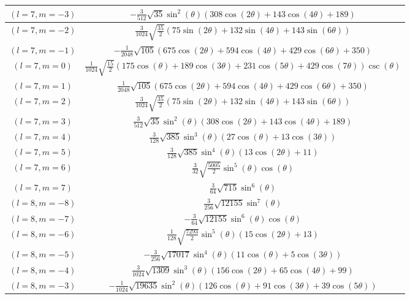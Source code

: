 \begin{center}
\begin{longtable}{|c|c|}
$(l=7, m=-3)$ & $-\frac{3}{512} \sqrt{35} \sin ^2(\theta ) (308 \cos (2 \theta )+143 \cos (4 \theta )+189)$ \\ \hline
$(l=7, m=-2)$ & $\frac{3}{1024} \sqrt{\frac{35}{2}} (75 \sin (2 \theta )+132 \sin (4 \theta )+143 \sin (6 \theta ))$ \\ \hline
\rowcolor{gray!15}
$(l=7, m=-1)$ & $-\frac{1}{2048} \sqrt{105} (675 \cos (2 \theta )+594 \cos (4 \theta )+429 \cos (6 \theta )+350)$ \\ \hline
$(l=7, m=0)$ & $\frac{1}{1024} \sqrt{\frac{15}{2}} (175 \cos (\theta )+189 \cos (3 \theta )+231 \cos (5 \theta )+429 \cos (7 \theta )) \csc (\theta )$ \\ \hline
\rowcolor{gray!15}
$(l=7, m=1)$ & $\frac{1}{2048} \sqrt{105} (675 \cos (2 \theta )+594 \cos (4 \theta )+429 \cos (6 \theta )+350)$ \\ \hline
$(l=7, m=2)$ & $\frac{3}{1024} \sqrt{\frac{35}{2}} (75 \sin (2 \theta )+132 \sin (4 \theta )+143 \sin (6 \theta ))$ \\ \hline
\rowcolor{gray!15}
$(l=7, m=3)$ & $\frac{3}{512} \sqrt{35} \sin ^2(\theta ) (308 \cos (2 \theta )+143 \cos (4 \theta )+189)$ \\ \hline
$(l=7, m=4)$ & $\frac{3}{128} \sqrt{385} \sin ^3(\theta ) (27 \cos (\theta )+13 \cos (3 \theta ))$ \\ \hline
\rowcolor{gray!15}
$(l=7, m=5)$ & $\frac{3}{128} \sqrt{385} \sin ^4(\theta ) (13 \cos (2 \theta )+11)$ \\ \hline
$(l=7, m=6)$ & $\frac{3}{32} \sqrt{\frac{5005}{2}} \sin ^5(\theta ) \cos (\theta )$ \\ \hline
\rowcolor{gray!15}
$(l=7, m=7)$ & $\frac{3}{64} \sqrt{715} \sin ^6(\theta )$ \\ \hline
$(l=8, m=-8)$ & $\frac{3}{256} \sqrt{12155} \sin ^7(\theta )$ \\ \hline
\rowcolor{gray!15}
$(l=8, m=-7)$ & $-\frac{3}{64} \sqrt{12155} \sin ^6(\theta ) \cos (\theta )$ \\ \hline
$(l=8, m=-6)$ & $\frac{1}{128} \sqrt{\frac{7293}{2}} \sin ^5(\theta ) (15 \cos (2 \theta )+13)$ \\ \hline
\rowcolor{gray!15}
$(l=8, m=-5)$ & $-\frac{3}{256} \sqrt{17017} \sin ^4(\theta ) (11 \cos (\theta )+5 \cos (3 \theta ))$ \\ \hline
$(l=8, m=-4)$ & $\frac{3}{1024} \sqrt{1309} \sin ^3(\theta ) (156 \cos (2 \theta )+65 \cos (4 \theta )+99)$ \\ \hline
\rowcolor{gray!15}
$(l=8, m=-3)$ & $-\frac{1}{1024} \sqrt{19635} \sin ^2(\theta ) (126 \cos (\theta )+91 \cos (3 \theta )+39 \cos (5 \theta ))$ \\ \hline

\end{longtable}
\end{center}
